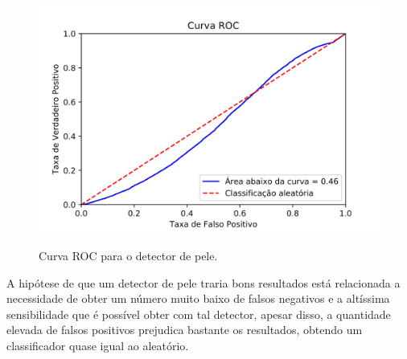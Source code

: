 \begin{figure}[htbp]
     \centering
     \caption{Curva ROC para o detector de pele.}
     \includegraphics[scale=1]{figs/curva_roc_skin.png}
     \label{fig:skin_roc}
 \end{figure}

A hipótese de que um detector de pele traria bons resultados está relacionada a necessidade de obter um número muito baixo de falsos negativos e a altíssima sensibilidade que é possível obter com tal detector, apesar disso, a quantidade elevada de falsos positivos prejudica bastante os resultados, obtendo um classificador quase igual ao aleatório.
